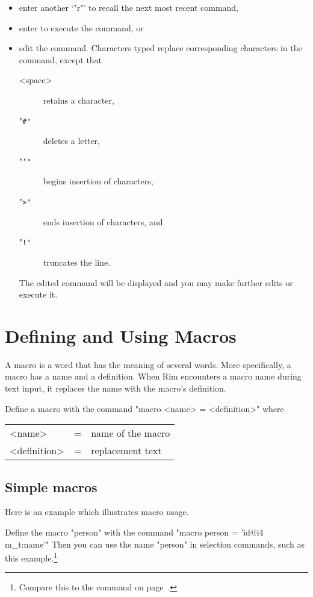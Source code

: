 \documentclass[11pt,a4paper]{report}
\def\I{\index}
\begin{document}
\begin{itemize}
\item enter another `"r"' to recall the next most recent command,
\item enter  to execute the command, or
\item edit the command.  Characters typed replace corresponding
  characters in the command, except that
 
  \begin{description}
  \item[<space>] retains a character,
  \item["\tt \#"] deletes a letter,
  \item["\tt \char`"] begins insertion of characters,
  \item["\tt >"] ends insertion of characters, and
  \item["\tt !"] truncates the line.
  \end{description}
 
  The edited command will be displayed and you may make further
  edits or execute it.
 
\end{itemize}
 
%
%
\chapter{Defining and Using Macros}
\I{macros|(}
\label{mac-chapter}
A macro is a word that has the meaning of several words.
More specifically, a macro has a name and a definition.
When Rim encounters a macro name during text input, it
replaces the name with the macro's definition.
 
Define a macro with the command
\I{macro@"macro"}
"macro <name> = <definition>"
where
 \begin{tabular}{lcl}
   <name> &=& name of the macro\\
   <definition> &=& replacement text
   \end{tabular}
 
\section{Simple macros}
Here is an example which illustrates macro usage.
 
Define the macro "person" with the command
"macro person = 'id@i4 m\_t:name'"
Then you can use the name "person" in selection commands, such as
this example.\footnote{Compare this to the command on
page~\pageref{sel-dem1}.}
 
\end{document}
